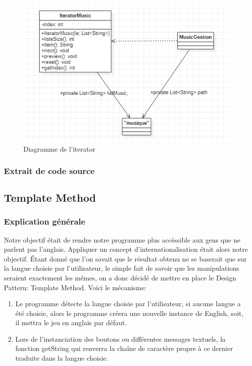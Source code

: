 \begin{figure}[h]
	\centering
	\includegraphics[width=\textwidth]{ttmc_iterator.png}
	\caption{Diagramme de l'iterator}
	\label{fig:diag_iterator}
\end{figure}

\subsubsection{Extrait de code source}


\newpage
\subsection{Template Method}

\subsubsection{Explication générale}

Notre objectif était de rendre notre programme plus accéssible aux gens que ne parlent pas l'anglais. Appliquer un concept d'internationalisation était alors notre objectif. Étant donné que l'on savait que le résultat obtenu ne se baserait que sur la langue choisie par l'utilisateur, le simple fait de savoir que les manipulations seraient exactement les mêmes, on a donc décidé de mettre en place le Design Pattern: Template Method. Voici le mécanisme:
\begin{enumerate}
\item Le programme détecte la langue choisie par l'utilisateur, si aucune langue a été choisie, alors le programme créera une nouvelle instance de English, soit, il mettra le jeu en anglais par défaut.
\item Lors de l'instanciation des boutons ou différentes messages textuels, la fonction getString qui renverra la chaîne de caractère propre à ce dernier traduite dans la langue choisie.
\end{enumerate}

